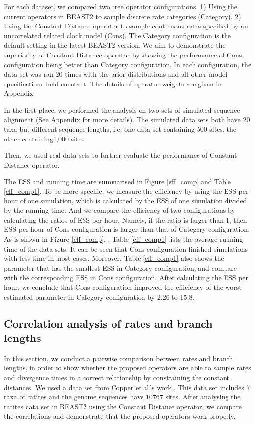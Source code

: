 \documentclass{bmcart}
\begin{document}
For each dataset, we compared two tree operator configurations. 1) Using the current operators in BEAST2 to sample discrete rate categories (Category). 2) Using the Constant Distance operator to sample continuous rates specified by an uncorrelated related clock model (Cons). The Category configuration is the default setting in the latest BEAST2 version. We aim to demonstrate the superiority of Constant Distance operator by showing the performance of Cons configuration being better than Category configuration. In each configuration, the data set was ran 20 times with the prior distributions and all other model specifications held constant. The details of operator weights are given in Appendix.

In the first place, we performed the analysis on two sets of simulated sequence alignment (See Appendix for more details). The simulated data sets both have 20 taxa but different sequence lengths, i.e. one data set containing 500 sites, the other containing1,000 sites. 

Then, we used real data sets to further evaluate the performance of Constant Distance operator. 


The ESS and running time are summarised in Figure \ref{eff_comp} and Table \ref{eff_comp1}. To be more specific, we measure the efficiency by using the ESS per hour of one simulation, which is calculated by the ESS of one simulation divided by the running time. And we compare the efficiency of two configurations by calculating the ratios of ESS per hour. Namely, if the ratio is larger than 1, then ESS per hour of Cons configuration is larger than that of Category configuration. As is shown in Figure \ref{eff_comp}, . Table \ref{eff_comp1} lists the average running time of the data sets. It can be seen that Cons configuration finished simulations with less time in most cases. Moreover, Table \ref{eff_comp1} also shows the parameter that has the smallest ESS in Category configuration, and compare with the corresponding ESS in Cons configuration. After calculating the ESS per hour, we conclude that Cons configuration improved the efficiency of the worst estimated parameter in Category configuration by  2.26 to 15.8. 

\subsection*{Correlation analysis of rates and branch lengths}
In this section, we conduct a pairwise comparison between rates and branch lengths, in order to show whether the proposed operators are able to sample rates and divergence times in a correct relationship by constraining the constant distances. We used a data set from Copper et al.'s work \cite{cooper2001complete}. This data set includes 7 taxa of ratites and the genome sequences have 10767 sites. After analysing the ratites data set in BEAST2 using the Constant Distance operator, we compare the correlations and demonstrate that the proposed operators work properly.
\end{document}
